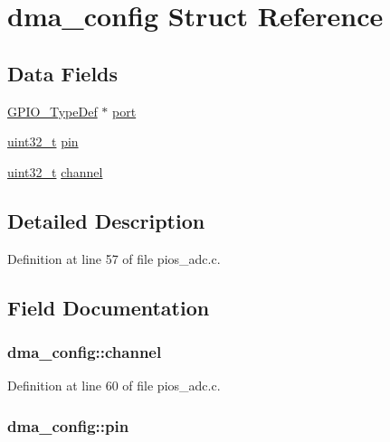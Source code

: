 \hypertarget{structdma__config}{\section{dma\-\_\-config Struct Reference}
\label{structdma__config}
}
\subsection*{Data Fields}
\begin{DoxyCompactItemize}
\item 
\hyperlink{struct_g_p_i_o___type_def}{G\-P\-I\-O\-\_\-\-Type\-Def} $\ast$ \hyperlink{structdma__config_a90a2a53a8d99c37df9555f77633ee508}{port}
\item 
\hyperlink{stdint_8h_a435d1572bf3f880d55459d9805097f62}{uint32\-\_\-t} \hyperlink{structdma__config_afdda59a07cc2955f33391d811ecad5eb}{pin}
\item 
\hyperlink{stdint_8h_a435d1572bf3f880d55459d9805097f62}{uint32\-\_\-t} \hyperlink{structdma__config_a52803afd9586446133f03f95c909ba19}{channel}
\end{DoxyCompactItemize}


\subsection{Detailed Description}


Definition at line 57 of file pios\-\_\-adc.\-c.



\subsection{Field Documentation}
\hypertarget{structdma__config_a52803afd9586446133f03f95c909ba19}{
\subsubsection[{channel}]{ dma\-\_\-config\-::channel}}\label{structdma__config_a52803afd9586446133f03f95c909ba19}


Definition at line 60 of file pios\-\_\-adc.\-c.

\hypertarget{structdma__config_afdda59a07cc2955f33391d811ecad5eb}{
\subsubsection[{pin}]{ dma\-\_\-config\-::pin}}\label{structdma__config_afdda59a07cc2955f33391d811ecad5eb}


